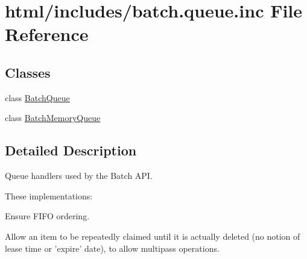 \hypertarget{batch_8queue_8inc}{
\section{html/includes/batch.queue.inc File Reference}
\label{batch_8queue_8inc}
}
\subsection*{Classes}
\begin{DoxyCompactItemize}
\item 
class \hyperlink{classBatchQueue}{BatchQueue}
\item 
class \hyperlink{classBatchMemoryQueue}{BatchMemoryQueue}
\end{DoxyCompactItemize}


\subsection{Detailed Description}
Queue handlers used by the Batch API.

These implementations:
\begin{DoxyItemize}
\item Ensure FIFO ordering.
\item Allow an item to be repeatedly claimed until it is actually deleted (no notion of lease time or 'expire' date), to allow multipass operations. 
\end{DoxyItemize}